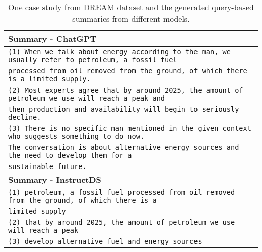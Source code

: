 \documentclass[11pt]{article}
\begin{document}
\begin{table*}[t]
\begin{adjustbox}{width=1.00\textwidth,center}
\begin{tabular}{ | l | }
        \textbf{Summary - ChatGPT} \\ \hline
        \texttt{(1) When we talk about energy according to the man, we usually refer to petroleum, a fossil fuel } \\
        \quad\quad \texttt{processed from oil removed from the ground, of which there is a limited supply.} \\ 
        \texttt{(2) Most experts agree that by around 2025, the amount of petroleum we use will reach a peak and } \\
        \quad\quad \texttt{then production and availability will begin to seriously decline.} \\ 
        \texttt{(3) There is no specific man mentioned in the given context who suggests something to do now.} \\
        \quad\quad \texttt{The conversation is about alternative energy sources and the need to develop them for a} \\
        \quad\quad \texttt{sustainable future.} \\  \hline \hline
        
        \textbf{Summary - InstructDS} \\ \hline
        \texttt{(1) petroleum, a fossil fuel processed from oil removed from the ground, of which there is a} \\
        \quad\quad \texttt{limited supply } \\ 
        \texttt{(2) that by around 2025, the amount of petroleum we use will reach a peak } \\ 
        \texttt{(3) develop alternative fuel and energy sources } \\
        
        \bottomrule
        \end{tabular}
        \end{adjustbox}
        \caption{One case study from DREAM dataset and the generated query-based summaries from different models.}
        \label{tab:DREAM_examples}
    \end{table*}
\end{document}
